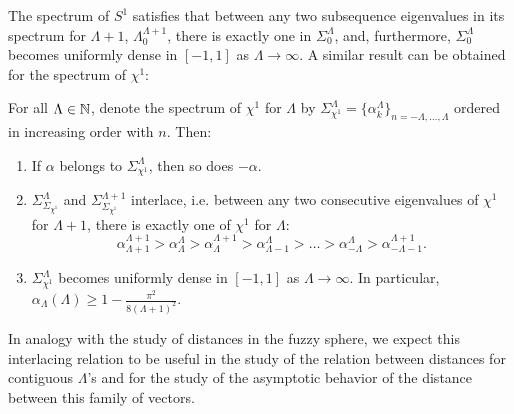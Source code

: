 The spectrum of $S^1$ satisfies that between any two subsequence eigenvalues in its spectrum for $\Lambda + 1$, $\Lambda_0^{\Lambda + 1}$, there is exactly one in $\Sigma_0^\Lambda$, and, furthermore, $\Sigma_0^\Lambda$ becomes uniformly dense in $[-1, 1]$ as $\Lambda \to \infty$. A similar result \cite{FioreXi2020, FioreTheCase2020} can be obtained for the spectrum of $\chi^1$:
\begin{theorem}
For all $\Lambda \in \mathbb{N}$, denote the spectrum of $\chi^1$ for $\Lambda$ by $\Sigma^\Lambda_{\chi^1} = \{\alpha_k^\Lambda\}_{n = -\Lambda, \dots, \Lambda }$ ordered in increasing order with $n$. Then:
\begin{enumerate}
    \item If $\alpha$ belongs to $\Sigma^\Lambda_{\chi^1}$, then so does $-\alpha$.
    
    \item $\Sigma_{\Sigma_{\chi^1}}^\Lambda$ and $\Sigma_{\Sigma_{\chi^1}}^{\Lambda+1}$ interlace, i.e. between any two consecutive eigenvalues of $\chi^1$ for $\Lambda +1$, there is exactly one of $\chi^1$ for $\Lambda$:
    \begin{equation}
        \alpha_{\Lambda+1}^{\Lambda+1} > \alpha_{\Lambda}^{\Lambda} > \alpha_\Lambda^{\Lambda+1} > \alpha_{\Lambda-1}^{\Lambda} > \dots > \alpha_{-\Lambda}^{\Lambda} > \alpha_{-\Lambda-1}^{\Lambda+1}.
    \end{equation}
    
    \item $\Sigma_{\chi^1}^\Lambda$ becomes uniformly dense in $[-1, 1]$ as $\Lambda \to \infty$. In particular, $\alpha_{\Lambda}(\Lambda) \geq 1 - \frac{\pi^2}{8(\Lambda + 1)^2}$.
\end{enumerate}
\end{theorem}

In analogy with the study of distances in the fuzzy sphere, we expect this interlacing relation to be useful in the study of the relation between distances for contiguous $\Lambda$'s and for the study of the asymptotic behavior of the distance between this family of vectors.


